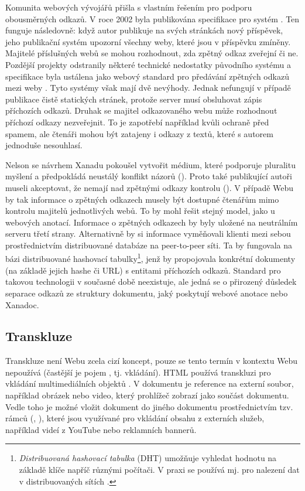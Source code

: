 Komunita webových vývojářů přišla s vlastním řešením pro podporu obousměrných odkazů. V roce 2002 byla publikována specifikace pro systém  \autocite{wiki:Trackback}. Ten funguje následovně: když autor publikuje na svých stránkách nový příspěvek, jeho publikační systém upozorní všechny weby, které jsou v příspěvku zmíněny. Majitelé příslušných webů se mohou rozhodnout, zda zpětný odkaz zveřejní či ne. Pozdější projekty odstranily některé technické nedostatky původního systému a specifikace  byla ustálena jako webový standard pro předávání zpětných odkazů mezi weby \autocite{W3C:Webmention}. Tyto systémy však mají dvě nevýhody. Jednak nefungují v případě publikace čistě statických stránek, protože server musí obsluhovat zápis příchozích odkazů. Druhak se majitel odkazovaného webu může rozhodnout příchozí odkazy nezveřejnit. To je zapotřebí například kvůli ochraně před spamem, ale čtenáři mohou být zatajeny i odkazy z textů, které s autorem jednoduše nesouhlasí.

\label{p:xw:bidir:dht}
Nelson se návrhem Xanadu pokoušel vytvořit médium, které podporuje pluralitu myšlení a předpokládá neustálý konflikt názorů (). Proto také publikující autoři museli akceptovat, že nemají nad zpětnými odkazy kontrolu (). V případě Webu by tak informace o zpětných odkazech musely být dostupné čtenářům mimo kontrolu majitelů jednotlivých webů. To by mohl řešit stejný model, jako u webových anotací. Informace o zpětných odkazech by byly uložené na neutrálním serveru třetí strany. Alternativně by si informace vyměňovali klienti mezi sebou prostřednictvím distribuované databáze na peer-to-peer síti. Ta by fungovala na bázi distribuované hashovací tabulky\footnote{\emph{Distribuovaná hashovací tabulka} (DHT) umožňuje vyhledat hodnotu na základě klíče napříč různými počítači. V praxi se používá mj. pro nalezení dat v distribuovaných sítích \autocite{wiki:DHT}.}, jenž by propojovala konkrétní dokumenty (na základě jejich hashe či URL) s entitami příchozích odkazů. Standard pro takovou technologii v současné době neexistuje, ale jedná se o přirozený důsledek separace odkazů ze struktury dokumentu, jaký poskytují webové anotace nebo Xanadoc.

\subsection{Transkluze}
\label{sec:web:trancl}

Transkluze není Webu zcela cizí koncept, pouze se tento termín v kontextu Webu nepoužívá (častější je pojem , tj. vkládání). HTML používá transkluzi pro vkládání multimediálních objektů \autocites[31]{Pam1995}[4.7]{W3C:HTML5}. V dokumentu je reference na externí soubor, například obrázek nebo video, který prohlížeč zobrazí jako součást dokumentu. Vedle toho je možné vložit dokument do jiného dokumentu prostřednictvím tzv. rámců (, \cite[viz][4.7.6]{W3C:HTML5}), které jsou využívané pro vkládání obsahu z externích služeb, například videí z YouTube nebo reklamních bannerů.

